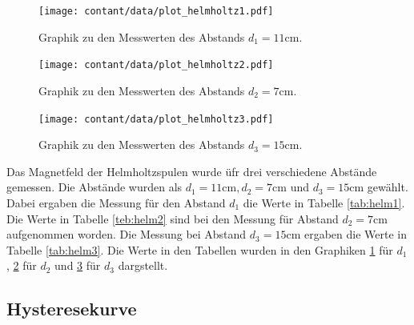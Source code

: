 \begin{figure}
\centering
\texttt{[image: contant/data/plot\_helmholtz1.pdf]}
\caption{Graphik zu den Messwerten des Abstands $d_1=11\si{\centi\metre}$. }
\label{fig:helm1}
\end{figure}

\begin{figure}
\centering
\texttt{[image: contant/data/plot\_helmholtz2.pdf]}
\caption{Graphik zu den Messwerten des Abstands  $d_2=7\si{\centi\metre}$.}
\label{fig:helm2}
\end{figure}

\begin{figure}
\centering
\texttt{[image: contant/data/plot\_helmholtz3.pdf]}
\caption{Graphik zu den Messwerten des Abstands $d_3=15\si{\centi\metre}$.}
\label{fig:helm3}
\end{figure}


Das Magnetfeld der Helmholtzspulen wurde üfr drei verschiedene Abstände gemessen.
Die Abstände wurden als $d_1=11\si{\centi\metre}, d_2=7\si{\centi\metre}$ und $d_3= 15 \si{\centi\metre}$ gewählt.
Dabei ergaben die Messung für den Abstand $d_1$ die Werte in Tabelle \ref{tab:helm1}.
Die Werte in Tabelle \ref{teb:helm2} sind bei den Messung für Abstand $d_2=7\si{\centi\metre}$ aufgenommen worden.
Die Messung bei Abstand $d_3=15\si{\centi\metre}$ ergaben die Werte in Tabelle \ref{tab:helm3}.
Die Werte in den Tabellen wurden in den Graphiken \ref{fig:helm1} für $d_1$, \ref{fig:helm2} für $d_2$ und \ref{fig:helm3} für $d_3$ dargstellt.

\subsection{Hysteresekurve}
